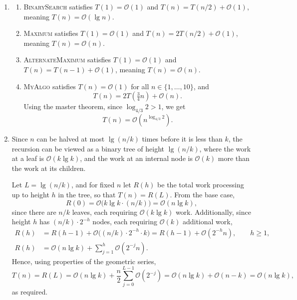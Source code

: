 \documentclass[12pt]{article}
\begin{document}
\begin{enumerate}
  \item
    \begin{enumerate}
      \item \textsc{BinarySearch} satisfies $T(1) = \mathcal O(1)$ and
        $T(n) = T(n/2) + \mathcal O(1)$, meaning $T(n) = \mathcal O(\lg n)$.

      \item \textsc{Maximum} satisfies $T(1) = \mathcal O(1)$ and
        $T(n) = 2T(n/2) + \mathcal O(1)$, meaning $T(n) = \mathcal O(n)$.

      \item \textsc{AlternateMaximum} satisfies $T(1) = \mathcal O(1)$ and
        $T(n) = T(n-1) + \mathcal O(1)$, meaning $T(n) = \mathcal O(n)$.

      \item \textsc{MyAlgo} satisfies $T(n) = \mathcal O(1)$ for all
        $n \in \{1, \ldots, 10\}$, and
        $$
        T(n) = 2T\!\left(\tfrac{3}{4}n\right) + \mathcal O(n).
        $$
        Using the master theorem, since $\log_{4/3} 2 > 1$, we get
        $$
        T(n) = \mathcal O\!\left(n^{\log_{4/3} 2}\right).
        $$
    \end{enumerate}

  \item Since $n$ can be halved at most $\lg(n/k)$ times before it is less
    than $k$, the recursion can be viewed as a binary tree of height
    $\lg(n/k)$, where the work at a leaf is $\mathcal O(k \lg k)$, and the work
    at an internal node is $\mathcal O(k)$ more than the work at its children.

    Let $L = \lg(n/k)$, and for fixed $n$ let $R(h)$ be the total work
    processing up to height $h$ in the tree, so that $T(n) = R(L)$. From the
    base case,
    $$
    R(0) = \mathcal O\big(k \lg k \cdot (n/k)\big) = \mathcal O(n \lg k),
    $$
    since there are $n/k$ leaves, each requiring $\mathcal O(k \lg k)$ work.
    Additionally, since height $h$ has $(n/k) \cdot 2^{-h}$ nodes, each
    requiring $\mathcal O(k)$ additional work,
    \begin{align*}
      R(h) &= R(h-1) + \mathcal O\big((n/k) \cdot 2^{-h} \cdot k\big)
      = R(h-1) + \mathcal O(2^{-h} n), \qquad h \geq 1, \\
      R(h) &= \mathcal O(n \lg k) + \sum_{j=1}^{h} \mathcal O(2^{-j} n).
    \end{align*}
    Hence, using properties of the geometric series,
    $$
    T(n) = R(L)
    = \mathcal O(n \lg k) + \frac{n}{2} \sum_{j=0}^{L-1} \mathcal O(2^{-j})
    = \mathcal O(n \lg k) + \mathcal O(n - k)
    = \mathcal O(n \lg k),
    $$
    as required.
\end{enumerate}
\end{document}
